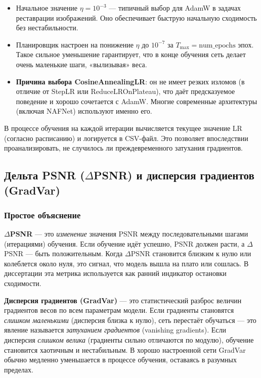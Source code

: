 \documentclass[12pt,a4paper]{article}
\begin{document}
\begin{itemize}
    \item Начальное значение \(\eta = 10^{-3}\) — типичный выбор для AdamW в задачах реставрации изображений. Оно обеспечивает быструю начальную сходимость без нестабильности.
    \item Планировщик настроен на понижение \(\eta\) до \(10^{-7}\) за \(T_{\max} = \text{num\_epochs}\) эпох. Такое сильное уменьшение гарантирует, что в конце обучения сеть делает очень маленькие шаги, «вылизывая» веса.
    \item \textbf{Причина выбора CosineAnnealingLR}: он не имеет резких изломов (в отличие от StepLR или ReduceLROnPlateau), что даёт предсказуемое поведение и хорошо сочетается с AdamW. Многие современные архитектуры (включая NAFNet) используют именно его.
\end{itemize}

В процессе обучения на каждой итерации вычисляется текущее значение LR (согласно расписанию) и логируется в CSV-файл. Это позволяет впоследствии проанализировать, не случилось ли преждевременного затухания градиентов.

\subsection{Дельта PSNR (\(\Delta\)PSNR) и дисперсия градиентов (GradVar)}

\subsubsection{Простое объяснение}

\textbf{\(\Delta\)PSNR} — это \textit{изменение} значения PSNR между последовательными шагами (итерациями) обучения. Если обучение идёт успешно, PSNR должен расти, а \(\Delta\)PSNR — быть положительным. Когда \(\Delta\)PSNR становится близким к нулю или колеблется около нуля, это сигнал, что модель вышла на плато или сошлась. В диссертации эта метрика используется как ранний индикатор остановки сходимости.

\textbf{Дисперсия градиентов (GradVar)} — это статистический разброс величин градиентов весов по всем параметрам модели. Если градиенты становятся \textit{слишком маленькими} (дисперсия близка к нулю), сеть перестаёт обучаться — это явление называется \textit{затуханием градиентов} (vanishing gradients). Если дисперсия \textit{слишком велика} (градиенты сильно отличаются по модулю), обучение становится хаотичным и нестабильным. В хорошо настроенной сети GradVar обычно медленно уменьшается в процессе обучения, оставаясь в разумных пределах.
\end{document}
